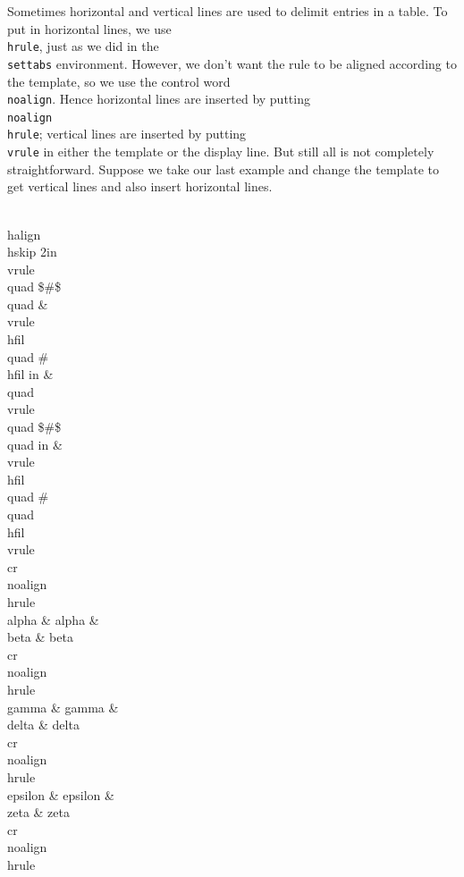 Sometimes horizontal and vertical lines are used to delimit 
entries in a table.  To put in horizontal lines, we use {\tt \\hrule}, 
just as we did in the {\tt \\settabs} environment. 
However, we don't want the rule to be aligned according to the 
template, so we use the control word {\tt \\noalign}.  Hence 
horizontal lines are inserted by putting {\tt \\noalign\lb\\hrule\rb}; 
vertical lines are inserted by putting {\tt \\vrule} 
in either the template or the display line. But still all is not 
completely straightforward.  Suppose we take our last example and 
change the template to get vertical lines and also insert 
horizontal lines. 

\beginuser 
\\halign\lb\\hskip 2in\\vrule\\quad \$\#\$\\quad \& \\vrule \\hfil\\quad %
\# \\hfil 
{} in \& \\quad \\vrule \\quad \$\#\$\\quad 
{} in \& \\vrule\\hfil \\quad \# \\quad \\hfil \\vrule \\cr 
\\noalign\lb\\hrule\rb 
\\alpha   \& alpha   \& \\beta  \& beta \\cr 
\\noalign\lb\\hrule\rb 
\\gamma   \& gamma   \& \\delta \& delta \\cr 
\\noalign\lb\\hrule\rb 
\\epsilon \& epsilon \& \\zeta  \& zeta \\cr 
\\noalign\lb\\hrule\rb 
\rb 
\enduser 

